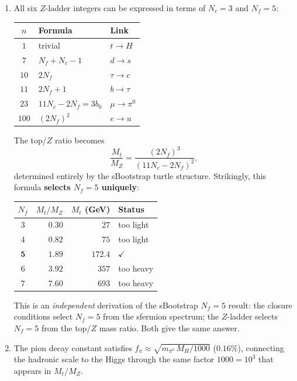 \documentclass[11pt]{article}
\begin{document}
\begin{enumerate}
  \item All six $Z$-ladder integers can be expressed in terms
    of $N_c = 3$ and $N_f = 5$:
    \begin{center}\small
    \begin{tabular}{@{}c l l@{}}
    \toprule
    $n$ & Formula & Link \\
    \midrule
    $1$ & trivial & $t\to H$ \\
    $7$ & $N_f+N_c-1$ & $d\to s$ \\
    $10$ & $2N_f$ & $\tau\to c$ \\
    $11$ & $2N_f+1$ & $b\to\tau$ \\
    $23$ & $11N_c-2N_f = 3b_0$ & $\mu\to\pi^0$ \\
    $100$ & $(2N_f)^2$ & $e\to u$ \\
    \bottomrule
    \end{tabular}
    \end{center}
    The top/$Z$ ratio becomes
    \begin{equation}
      \frac{M_t}{M_Z} = \frac{(2N_f)^3}{(11N_c-2N_f)^2},
    \end{equation}
    determined entirely by the sBootstrap turtle structure.
    Strikingly, this formula \textbf{selects $N_f = 5$ uniquely}:

    \begin{center}\small
    \begin{tabular}{@{}c r r l@{}}
    \toprule
    $N_f$ & $M_t/M_Z$ & $M_t$ (GeV) & Status \\
    \midrule
    $3$ & $0.30$ & $27$ & too light \\
    $4$ & $0.82$ & $75$ & too light \\
    $\mathbf{5}$ & $\mathbf{1.89}$ & $\mathbf{172.4}$ & $\checkmark$ \\
    $6$ & $3.92$ & $357$ & too heavy \\
    $7$ & $7.60$ & $693$ & too heavy \\
    \bottomrule
    \end{tabular}
    \end{center}

    \noindent
    This is an \emph{independent} derivation of the sBootstrap
    $N_f=5$ result: the closure conditions select $N_f=5$ from
    the sfermion spectrum; the $Z$-ladder selects $N_f=5$ from
    the top/$Z$ mass ratio.  Both give the same answer.

  \item The pion decay constant satisfies
    $f_\pi \approx \sqrt{m_{\pi^0}\,M_H/1000}$ ($0.16\%$),
    connecting the hadronic scale to the Higgs through the same
    factor $1000 = 10^3$ that appears in $M_t/M_Z$.
\end{enumerate}
\end{document}
